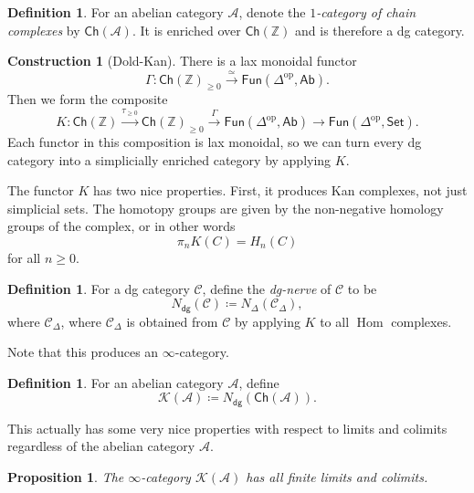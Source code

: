 \documentclass[10pt, oneside]{memoir}
\newtheorem{prop}[thm]{Proposition}
\theoremstyle{definition}
\newtheorem{defn}[thm]{Definition}
\newtheorem{con}[thm]{Construction}
\theoremstyle{remark}
\theoremstyle{plain}
\theoremstyle{definition}
\theoremstyle{remark}
\newcommand{\Z}{\mathbb{Z}}
\newcommand{\mc}[1]{\mathcal{#1}}
\newcommand{\ms}[1]{\mathsf{#1}}
\newcommand{\1}{\mathbf{1}}
\newcommand{\2}{\mathbf{2}}
\newcommand{\3}{\mathbf{3}}
\DeclareMathOperator{\Hom}{Hom}
\DeclareMathOperator{\op}{op}
\begin{document}
\begin{defn}
    For an abelian category \(\mc{A} \), denote the \textit{\(1 \)-category of chain complexes} by \(\ms{Ch}(\mc{A}) \). It is enriched over \(\ms{Ch}(\Z) \) and is therefore a dg category.
\end{defn}

\begin{con}[Dold-Kan]
    There is a lax monoidal functor
    \[ \Gamma \colon \ms{Ch}(\Z)_{\geq 0} \xrightarrow{\simeq} \ms{Fun}(\Delta^{\op}, \ms{Ab}). \]
    Then we form the composite
    \[ K \colon \ms{Ch}(\Z) \xrightarrow{\tau_{\geq 0}} \ms{Ch}(\Z)_{\geq 0} \xrightarrow{\Gamma} \ms{Fun}(\Delta^{\op}, \ms{Ab}) \to \ms{Fun}(\Delta^{\op}, \ms{Set}). \]
    Each functor in this composition is lax monoidal, so we can turn every dg category into a simplicially enriched category by applying \(K \).
\end{con}

The functor \(K \) has two nice properties. First, it produces Kan complexes, not just simplicial sets. The homotopy groups are given by the non-negative homology groups of the complex, or in other words
\[ \pi_n K(C) = H_n(C) \]
for all \(n \geq 0 \).

\begin{defn}
    For a dg category \(\mc{C} \), define the \textit{dg-nerve} of \(\mc{C} \) to be
    \[ N_{\ms{dg}}(\mc{C}) \coloneqq N_{\Delta} (\mc{C}_{\Delta}), \]
    where \(\mc{C}_{\Delta} \), where \(\mc{C}_{\Delta} \) is obtained from \(\mc{C} \) by applying \(K \) to all \(\Hom \) complexes.
\end{defn}
Note that this produces an \(\infty \)-category.

\begin{defn}
    For an abelian category \(\mc{A} \), define
    \[ \mc{K}(\mc{A}) \coloneqq N_{\ms{dg}}(\ms{Ch}(\mc{A})). \]
\end{defn}

This actually has some very nice properties with respect to limits and colimits regardless of the abelian category \(\mc{A} \).

\begin{prop}
    The \(\infty \)-category \(\mc{K}(\mc{A}) \) has all finite limits and colimits.
\end{prop}
\end{document}
